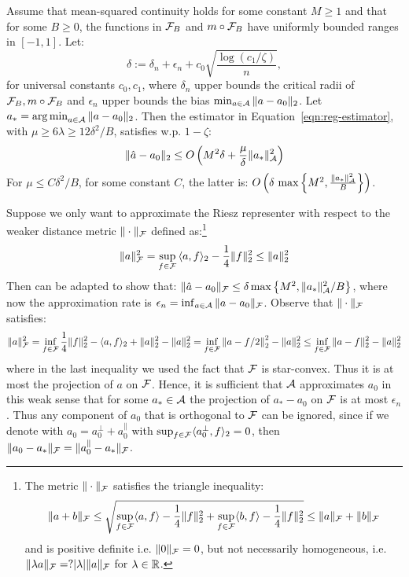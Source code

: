 \begin{theorem}\label{thm:reg-main-error}
Assume that mean-squared continuity holds for some constant $M\geq 1$ and that for some $B\geq 0$, the functions in ${\mathcal F}_B$ and $m\circ {\mathcal F}_B$ have uniformly bounded ranges in $[-1, 1]$. Let:
\[
\delta:=\delta_n + \epsilon_n + c_0 \sqrt{\frac{\log(c_1/\zeta)}{n}},
\]
for universal constants $c_0, c_1$, where $\delta_n$ upper bounds the critical radii of ${\mathcal F}_{B}, m\circ {\mathcal F}_B$
and $\epsilon_n$ upper bounds the bias $\min_{a\in {\mathcal A}} \|a-a_0\|_2$. 
Let $a_*=\operatorname*{arg\,min}_{a\in {\mathcal A}} \|a-a_0\|_2$. Then the estimator in Equation~\cref{eqn:reg-estimator}, with $\mu \geq 6\lambda \geq 12\delta^2/B$, satisfies w.p. $1-\zeta$:
\begin{equation}
    \|\hat{a} - a_0\|_2 \leq O\left(M^2 \delta + \frac{\mu}{\delta} \|a_*\|_{{\mathcal A}}^2\right)
\end{equation}
For $\mu\leq C \delta^2/B$, for some constant $C$, the latter is: $O\left(\delta\,\max\left\{M^2, \frac{\|a_*\|_{{\mathcal A}}^2}{B}\right\}\right)$.
\end{theorem}

\begin{remark}
Suppose we only want to approximate the Riesz representer with respect to the weaker distance metric $\|\cdot\|_{{\mathcal F}}$ defined as:\footnote{The metric $\|\cdot\|_{{\mathcal F}}$ satisfies the triangle inequality:
\begin{equation}
    \|a + b\|_{{\mathcal F}} \leq \sqrt{\sup_{f\in {\mathcal F}} \langle a, f \rangle - \frac{1}{4} \|f\|_2^2 + \sup_{f\in {\mathcal F}} \langle b, f \rangle - \frac{1}{4} \|f\|_2^2} \leq \|a\|_{{\mathcal F}} + \|b\|_{{\mathcal F}}
\end{equation}
and is positive definite i.e. $\|0\|_{{\mathcal F}}=0$, but not necessarily homogeneous, i.e. $\|\lambda a\|_{{\mathcal F}}=? |\lambda| \|a\|_{{\mathcal F}}$ for $\lambda\in \mathbb{R}$.}
\begin{equation}
    \|a\|_{{\mathcal F}}^2 = \sup_{f\in {\mathcal F}}\, \langle a, f \rangle_2 - \frac{1}{4}\|f\|_2^2 \leq \|a\|_2^2
\end{equation}
Then  can be adapted to show that: $\|\hat{a}-a_0\|_{{\mathcal F}} \leq \delta \max\left\{M^2, \|a_*\|_{{\mathcal A}}^2/B\right\}$, where now the approximation rate is $\epsilon_n = \inf_{a\in {\mathcal A}}\|a-a_0\|_{{\mathcal F}}$. Observe that $\|\cdot\|_{{\mathcal F}}$ satisfies:
\begin{equation}
    \|a\|_{{\mathcal F}}^2 = \inf_{f\in {\mathcal F}} \frac{1}{4} \|f\|_2^2 - \langle a, f \rangle_2 + \|a\|_2^2 - \|a\|_2^2 = \inf_{f\in {\mathcal F}} \left\|a - f/2\right\|_2^2 - \|a\|_2^2 \leq \inf_{f \in {\mathcal F}} \|a - f\|_2^2 - \|a\|_2^2
\end{equation}
where in the last inequality we used the fact that ${\mathcal F}$ is star-convex. Thus it is at most the projection of $a$ on ${\mathcal F}$. Hence, it is sufficient that ${\mathcal A}$ approximates $a_0$ in this weak sense that for some $a_*\in {\mathcal A}$ the projection of $a_*-a_0$ on ${\mathcal F}$ is at most $\epsilon_n$. Thus any component of $a_0$ that is orthogonal to ${\mathcal F}$ can be ignored, since if we denote with $a_0 = a_0^{\perp} + a_0^{\parallel}$ with $\sup_{f\in {\mathcal F}} \langle a_0^{\perp}, f \rangle_2=0$, then $\|a_0 - a_*\|_{{\mathcal F}} = \|a_0^{\parallel} - a_*\|_{{\mathcal F}}$.
\end{remark}

